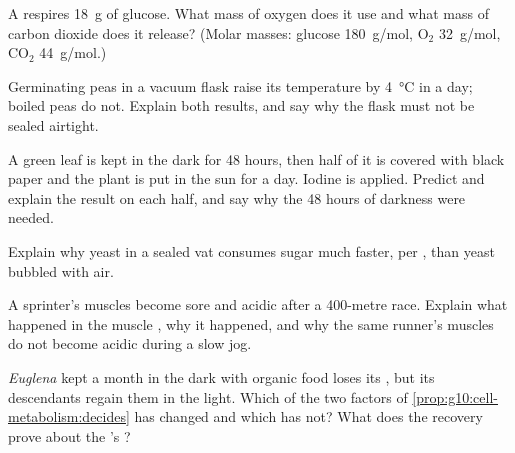 \begin{exercise}[$\star\star$]\label{exo:g10:cell-metabolism:8}
A  respires \qty{18}{g} of glucose. What mass of oxygen does it use
and what mass of carbon dioxide does it release? (Molar masses:
glucose \qty{180}{g/mol}, $\mathrm{O_2}$ \qty{32}{g/mol},
$\mathrm{CO_2}$ \qty{44}{g/mol}.)
\end{exercise}

\begin{exercise}[$\star\star$]\label{exo:g10:cell-metabolism:9}
Germinating peas in a vacuum flask raise its temperature by
\qty{4}{\celsius} in a day; boiled peas do not. Explain both results,
and say why the flask must not be sealed airtight.
\end{exercise}

\begin{exercise}[$\star\star$]\label{exo:g10:cell-metabolism:10}
A green leaf is kept in the dark for 48 hours, then half of it is
covered with black paper and the plant is put in the sun for a day.
Iodine is applied. Predict and explain the result on each half, and
say why the 48 hours of darkness were needed.
\end{exercise}

\begin{exercise}[$\star\star$]\label{exo:g10:cell-metabolism:11}
Explain why yeast in a sealed vat consumes sugar much faster, per
, than yeast bubbled with air.
\end{exercise}

\begin{exercise}[$\star\star\star$]\label{exo:g10:cell-metabolism:12}
A sprinter's muscles become sore and acidic after a 400-metre race.
Explain what happened in the muscle , why it happened, and why
the same runner's muscles do not become acidic during a slow jog.
\end{exercise}

\begin{exercise}[$\star\star\star$]\label{exo:g10:cell-metabolism:13}
\emph{Euglena} kept a month in the dark with organic food loses its
, but its descendants regain them in the light. Which of
the two factors of \cref{prop:g10:cell-metabolism:decides} has changed
and which has not? What does the recovery prove about the 's
?
\end{exercise}

